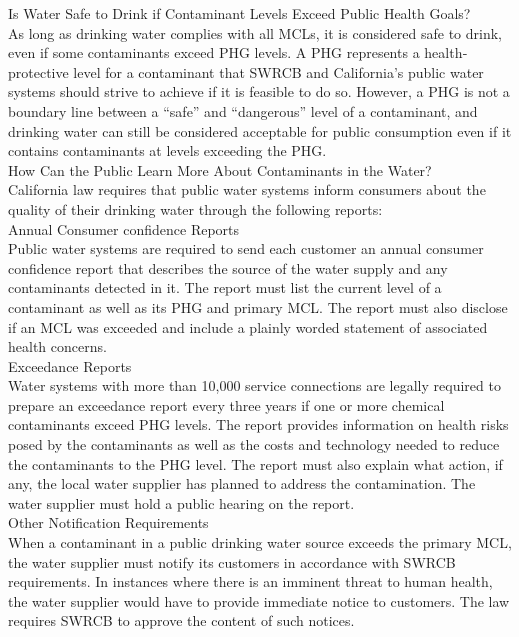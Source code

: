Is Water Safe to Drink if Contaminant Levels Exceed Public Health Goals?\\
 As long as drinking water complies with all MCLs, it is considered safe to drink, even if some contaminants exceed PHG levels. A PHG represents a health‐protective level for a contaminant that SWRCB and California’s public water systems should strive to achieve if it is feasible to do so. However, a PHG is not a boundary line between a “safe” and “dangerous” level of a contaminant, and drinking water can still be considered acceptable for public consumption even if it contains contaminants at levels exceeding the PHG.\\
How Can the Public Learn More About Contaminants in the Water? \\
California law requires that public water systems inform consumers about the quality of their drinking water through the following reports:\\
Annual Consumer confidence Reports\\
 Public water systems are required to send each customer an annual consumer confidence report that describes the source of the water supply and any contaminants detected in it. The report must list the current level of a contaminant as well as its PHG and primary MCL. The report must also disclose if an MCL was exceeded and include a plainly worded statement of associated health concerns.\\

Exceedance Reports\\
 Water systems with more than 10,000 service connections are legally required to prepare an exceedance report every three years if one or more chemical contaminants exceed PHG levels. The report provides information on health risks posed by the contaminants as well as the costs and technology needed to reduce the contaminants to the PHG level. The report must also explain what action, if any, the local water supplier has planned to address the contamination. The water supplier must hold a public hearing on the report.\\
Other Notification Requirements\\
When a contaminant in a public drinking water source exceeds the primary MCL, the water supplier must notify its customers in accordance with SWRCB requirements. In instances where there is an imminent threat to human health, the water supplier would have to provide immediate notice to customers. The law requires SWRCB to approve the content of such notices.\\

